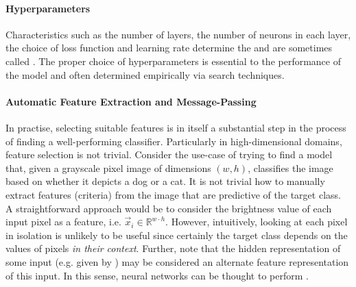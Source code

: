 \documentclass[
	fontsize=10pt, %
	twoside=false, %
	secnumdepth=1, %
  toc=indentunnumbered %
]{kaobook}
\begin{document}
\paragraph{Hyperparameters} Characteristics such as the number of layers, the
number of neurons in each layer, the choice of loss function and learning rate
determine the  and are sometimes called
. The proper choice of hyperparameters is essential to the
performance of the model and often determined empirically via search techniques.

\paragraph{Automatic Feature Extraction and Message-Passing}
In practise, selecting suitable features is in itself a substantial
step in the process of finding a well-performing classifier.
%
Particularly in high-dimensional domains, feature selection is not trivial.
Consider the use-case of trying to find a model that, given a grayscale pixel
image of dimensions $(w, h)$, classifies the image based on whether it depicts a
dog or a cat. It is not trivial how to manually extract features (criteria) from
the image that are predictive of the target class. A straightforward approach
would be to consider the brightness value of each input pixel as a feature, i.e.
$\vec x_i \in \mathbb{R}^{w \cdot h}$. However, intuitively, looking at each
pixel in isolation is unlikely to be useful since certainly the target class
depends on the values of pixels \textit{in their context}.
Further, note that the hidden representation of some input (e.g. given by
) may be considered an alternate feature representation
of this input. In this sense, neural networks can be thought to perform
. 

\end{document}
